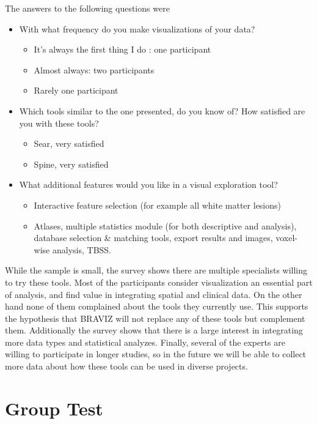 The answers to the following questions were

\begin{itemize}
	\item With what frequency do you make visualizations of your data?
	\begin{itemize}
		\item It's always the first thing I do : one participant
		\item Almost always: two participants
		\item Rarely one participant
	\end{itemize}
	\item Which tools similar to the one presented, do you know of? How satisfied are you with these tools?
	\begin{itemize}
		\item Sear, very satisfied
		\item Spine, very satisfied
	\end{itemize}
	\item What additional features would you  like in a visual exploration tool?
	\begin{itemize}
		\item Interactive feature selection (for example all white matter lesions)
		\item Atlases, multiple statistics module (for both descriptive and analysis), database selection \& matching tools, export results and images, voxel-wise analysis, TBSS.
	\end{itemize}	
\end{itemize}

\smallskip

While the sample is small, the survey shows there are multiple specialists willing to try these tools. Most of the participants consider visualization an essential part of analysis, and find value in integrating spatial and clinical data. On the other hand none of them complained about the tools they currently use. This supports the hypothesis that BRAVIZ will not replace any of these tools but complement them. Additionally the survey shows that there is a large interest in integrating more data types and statistical analyzes. Finally, several of the experts are willing to participate in longer studies, so in the future we will be able to collect more data about how these tools can be used in diverse projects.

\section{Group Test}

